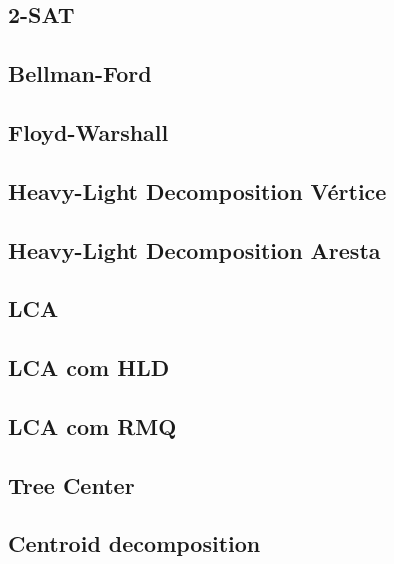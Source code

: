 \documentclass[12pt, a4paper, twoside]{article}
\begin{document}
\subsection{2-SAT}


\subsection{Bellman-Ford}


\subsection{Floyd-Warshall}


\subsection{Heavy-Light Decomposition Vértice}


\subsection{Heavy-Light Decomposition Aresta}


\subsection{LCA}


\subsection{LCA com HLD}


\subsection{LCA com RMQ}


\subsection{Tree Center}


\subsection{Centroid decomposition}

\end{document}
